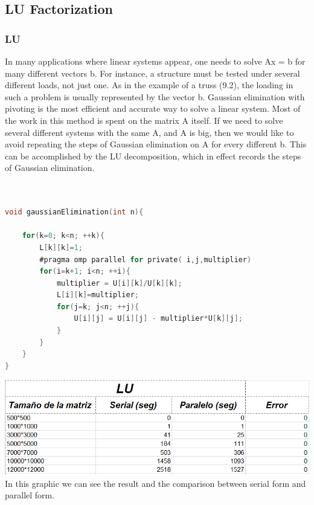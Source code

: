 \documentclass{article}
\newcounter{subsubsubsection}[subsubsection]
\begin{document}
\subsection{LU Factorization}

\subsubsection{LU}


In many applications where linear systems appear, one needs to solve Ax = b for many different vectors b.
For instance, a structure must be tested under several different loads, not just one. As in the example of a
truss (9.2), the loading in such a problem is usually represented by the vector b. Gaussian elimination with
pivoting is the most efficient and accurate way to solve a linear system. Most of the work in this method is
spent on the matrix A itself. If we need to solve several different systems with the same A, and A is big,
then we would like to avoid repeating the steps of Gaussian elimination on A for every different b. This can
be accomplished by the LU decomposition, which in effect records the steps of Gaussian elimination.




\begin{lstlisting}[language=C]


void gaussianElimination(int n){
	
	for(k=0; k<n; ++k){
		L[k][k]=1;
        #pragma omp parallel for private( i,j,multiplier) 
		for(i=k+1; i<n; ++i){
			multiplier = U[i][k]/U[k][k];
			L[i][k]=multiplier;
			for(j=k; j<n; ++j){
				U[i][j] = U[i][j] - multiplier*U[k][j];
			}
		}
	}
}

\end{lstlisting}



\includegraphics[width=\linewidth]{./images/lu.PNG}\\
In this graphic we can see the result and the comparison between serial form and parallel form.
\end{document}
